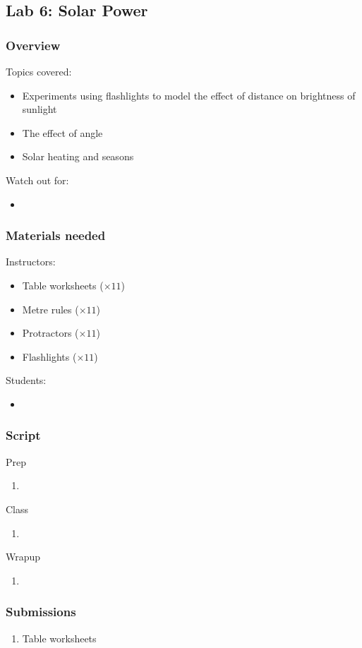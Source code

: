 \documentclass[12pt]{article}
\begin{document}
\newpage
\subsection{Lab 6: Solar Power}
\subsubsection{Overview}
Topics covered:
\begin{itemize}
\item Experiments using flashlights to model the effect of distance on brightness of sunlight
\item The effect of angle
\item Solar heating and seasons
\end{itemize}
Watch out for:
\begin{itemize}
\item 
\end{itemize}

\subsubsection{Materials needed}
Instructors:
\begin{itemize}
  \item Table worksheets ($\times 11$)
  \item Metre rules ($\times 11$)
  \item Protractors ($\times 11$)
  \item Flashlights ($\times 11$)
\end{itemize}
Students:
\begin{itemize}
  \item 
\end{itemize}

\subsubsection{Script}
Prep
\begin{enumerate}
\item
\end{enumerate}
Class
\begin{enumerate}
\item
\end{enumerate}
Wrapup
\begin{enumerate}
\item
\end{enumerate}

\subsubsection{Submissions}
\begin{enumerate}
    \item Table worksheets
\end{enumerate}
\end{document}

